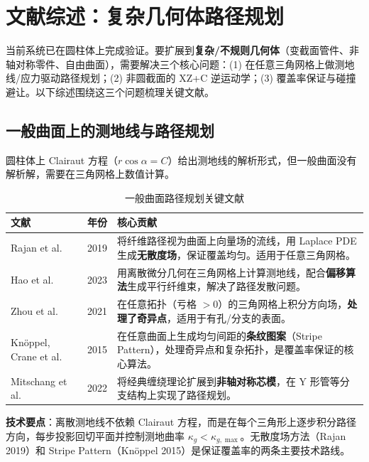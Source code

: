 \documentclass[11pt,a4paper]{article}
\begin{document}
\section{文献综述：复杂几何体路径规划}

当前系统已在圆柱体上完成验证。要扩展到\textbf{复杂/不规则几何体}（变截面管件、非轴对称零件、自由曲面），需要解决三个核心问题：(1) 在任意三角网格上做测地线/应力驱动路径规划；(2) 非圆截面的 XZ+C 逆运动学；(3) 覆盖率保证与碰撞避让。以下综述围绕这三个问题梳理关键文献。

\subsection{一般曲面上的测地线与路径规划}

圆柱体上 Clairaut 方程（$r \cos\alpha = C$）给出测地线的解析形式，但一般曲面没有解析解，需要在三角网格上数值计算。

\begin{table}[H]
\centering
\small
\begin{tabularx}{\textwidth}{l l X}
\toprule
\textbf{文献} & \textbf{年份} & \textbf{核心贡献} \\
\midrule
Rajan et al. & 2019 & 将纤维路径视为曲面上向量场的流线，用 Laplace PDE 生成\textbf{无散度场}，保证覆盖均匀。适用于任意三角网格。 \\
Hao et al. & 2023 & 用离散微分几何在三角网格上计算测地线，配合\textbf{偏移算法}生成平行纤维束，解决了路径发散问题。 \\
Zhou et al. & 2021 & 在任意拓扑（亏格 $> 0$）的三角网格上积分方向场，\textbf{处理了奇异点}，适用于有孔/分支的表面。 \\
Knöppel, Crane et al. & 2015 & 在任意曲面上生成均匀间距的\textbf{条纹图案}（Stripe Pattern），处理奇异点和复杂拓扑，是覆盖率保证的核心算法。 \\
Mitschang et al. & 2022 & 将经典缠绕理论扩展到\textbf{非轴对称芯模}，在 Y 形管等分支结构上实现了路径规划。 \\
\bottomrule
\end{tabularx}
\caption{一般曲面路径规划关键文献}
\end{table}

\textbf{技术要点}：离散测地线不依赖 Clairaut 方程，而是在每个三角形上逐步积分路径方向，每步投影回切平面并控制测地曲率 $\kappa_g < \kappa_{g,\max}$。无散度场方法（Rajan 2019）和 Stripe Pattern（Knöppel 2015）是保证覆盖率的两条主要技术路线。
\end{document}
